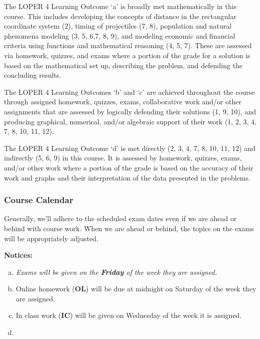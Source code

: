 \documentclass[12pt]{article}
\newcounter{on}\setcounter{on}{0}
\newcounter{ex}\setcounter{ex}{0}
\newenvironment{alphalist}{
  \begin{enumerate}[(a)]
    \addtolength{\itemsep}{-0.75\itemsep}}
  {\end{enumerate}}
\begin{document}
The LOPER 4 Learning Outcome `a' is broadly met mathematically 
in this course.  This includes developing the concepts of distance 
in the rectangular coordinate system (2), timing of projectiles (7, 8),  
population and natural phenomena modeling (3, 5, 6,7, 8, 9), and modeling 
economic and financial criteria using functions and mathematical reasoning (4, 5, 7).  
These are assessed via homework, quizzes, and exams where a portion of the grade 
for a solution is based on the mathematical set up, describing the problem, and 
defending the concluding results. 

The LOPER 4 Learning 
Outcomes `b' and `c' are achieved throughout the course through assigned homework, 
quizzes, exams, collaborative work and/or other assignments that are assessed by 
logically defending their solutions (1, 9, 10), and producing graphical, numerical, 
and/or algebraic support of their work (1, 2, 3, 4, 7, 8, 10, 11, 12).  

 The LOPER 4 Learning 
Outcome `d' is met directly (2, 3, 4, 7, 8, 10, 11, 12) and indirectly (5, 6, 9) 
in this course.  It is assessed by homework, quizzes, exams, and/or other work where 
a portion of the grade is based on the accuracy of their work and graphs and their 
interpretation of the data presented in the problems. 


\subsubsection*{Course Calendar}

Generally, we'll adhere to the scheduled exam dates even if we are ahead or behind with course work.  
When we are ahead or behind, the topics on the exams will be appropriately adjusted.  


\vspace{0.1in}
\noindent \textbf{Notices:}


\begin{alphalist}
   \item \emph{Exams will be given on the \textbf{Friday} of the week they are assigned.}

    \item Online homework (\textbf{OL}) will be due at midnight on  Saturday of the week they are assigned.  
     
    \item In class work (\textbf{IC}) will be given on Wednesday of the week it is assigned.
    \item 

\end{alphalist}
\end{document}
